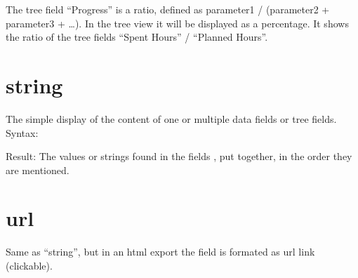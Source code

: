 \documentclass[letterpaper,10pt,english]{sphinxmanual}
\begin{document}
\begin{sphinxVerbatim}[commandchars=\\\{\}]
 
     
     \PYG{p}{[} \PYG{p}{]}
     \PYG{p}{[}\PYG{p}{]}
     \PYG{p}{[}\PYG{p}{]}
     \PYG{p}{[}\PYG{p}{]}
\end{sphinxVerbatim}

\sphinxAtStartPar
The tree field “Progress” is a ratio, defined as parameter1 / (parameter2 + parameter3 + …). In the tree view it will be displayed as a percentage. It shows the ratio of the tree fields “Spent Hours” / “Planned Hours”.


\section{string}
\label{\detokenize{tree-fields:string}}
\sphinxAtStartPar
The simple display of the content of one or multiple data fields or tree fields.
Syntax:

\begin{sphinxVerbatim}[commandchars=\\\{\}]
 
     
     \PYG{p}{[}\PYG{p}{]}
     \PYG{p}{[}\PYG{p}{]}
     \PYG{p}{[}\PYG{p}{]}
     \PYG{p}{[}\PYG{p}{]}
\end{sphinxVerbatim}

\sphinxAtStartPar
Result: The values or strings found in the fields , put together, in the order they are mentioned.


\section{url}
\label{\detokenize{tree-fields:url}}
\sphinxAtStartPar
Same as “string”, but in an html export the field is formated as url link (clickable).
\end{document}
